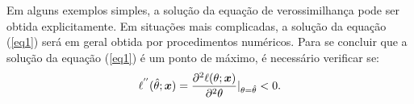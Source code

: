 \documentclass[12pt]{beamer}
\begin{document}

\begin{frame}{}
    \begin{block}{}
    \justifying
Em alguns exemplos simples, a solução da equação de verossimilhança pode ser obtida explicitamente. Em situações mais complicadas, a solução da equação (\ref{eq1}) será em geral obtida por procedimentos numéricos. Para se concluir que a solução da equação (\ref{eq1}) é um ponto de máximo, é necessário verificar se:
\begin{align}\label{eq1}
    \ell^{''}(\hat{\theta};\boldsymbol{x})=\dfrac{\partial^{2} \ell(\theta;\boldsymbol{x})}{\partial^{2} \theta}|_{\theta=\hat{\theta}}<0.
\end{align}
\end{block}
\end{frame}
\end{document}
